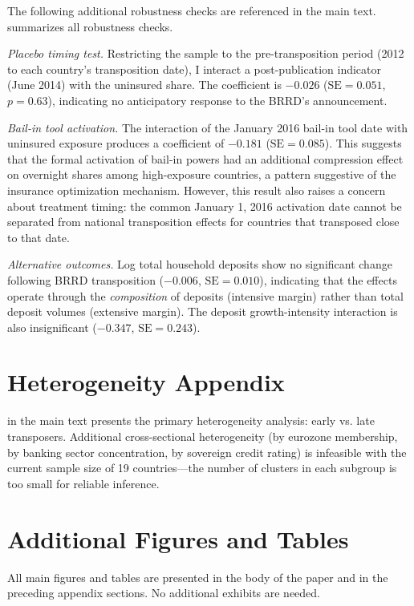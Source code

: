 \documentclass[12pt]{article}
\begin{document}
The following additional robustness checks are referenced in the main text.  summarizes all robustness checks.



\textit{Placebo timing test.} Restricting the sample to the pre-transposition period (2012 to each country's transposition date), I interact a post-publication indicator (June 2014) with the uninsured share. The coefficient is $-0.026$ ($\text{SE} = 0.051$, $p = 0.63$), indicating no anticipatory response to the BRRD's announcement.

\textit{Bail-in tool activation.} The interaction of the January 2016 bail-in tool date with uninsured exposure produces a coefficient of $-0.181$ ($\text{SE} = 0.085$). This suggests that the formal activation of bail-in powers had an additional compression effect on overnight shares among high-exposure countries, a pattern suggestive of the insurance optimization mechanism. However, this result also raises a concern about treatment timing: the common January 1, 2016 activation date cannot be separated from national transposition effects for countries that transposed close to that date.

\textit{Alternative outcomes.} Log total household deposits show no significant change following BRRD transposition ($-0.006$, $\text{SE} = 0.010$), indicating that the effects operate through the \textit{composition} of deposits (intensive margin) rather than total deposit volumes (extensive margin). The deposit growth-intensity interaction is also insignificant ($-0.347$, $\text{SE} = 0.243$).


\section{Heterogeneity Appendix}

 in the main text presents the primary heterogeneity analysis: early vs. late transposers. Additional cross-sectional heterogeneity (by eurozone membership, by banking sector concentration, by sovereign credit rating) is infeasible with the current sample size of 19 countries—the number of clusters in each subgroup is too small for reliable inference.


\section{Additional Figures and Tables}

All main figures and tables are presented in the body of the paper and in the preceding appendix sections. No additional exhibits are needed.
\end{document}
